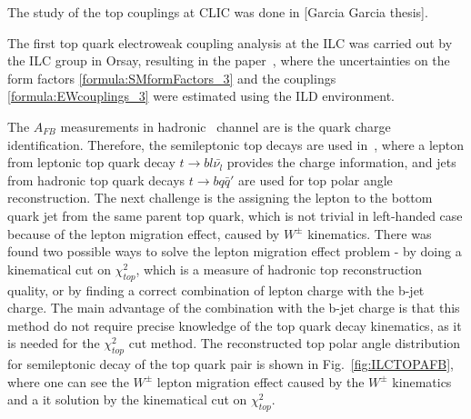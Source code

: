 The study of the top couplings at CLIC was done in [Garcia Garcia thesis]. 

The first top quark electroweak coupling analysis at the ILC was carried out by the ILC group in Orsay, resulting in the paper~\cite{bib:ILCTOP}, where the uncertainties on the form factors \ref{formula:SMformFactors_3} and the couplings \ref{formula:EWcouplings_3} were estimated using the ILD environment.


The $A_{FB}$ measurements in hadronic \ttbar\ channel are  is the quark charge identification. Therefore, the semileptonic top decays are used in~\cite{bib:ILCTOP}, where  a lepton from leptonic top quark decay $t\to b l \bar{\nu_l}$ provides the charge information, and jets from hadronic top quark decays $t \to b q \bar{q}'$ are used for top polar angle reconstruction. 
The next challenge is the assigning the lepton to the bottom quark jet from the same parent top quark, which is not trivial in left-handed case because of the lepton migration effect, caused by $W^\pm$ kinematics. 
There was found two possible ways to solve the lepton migration effect problem - by doing a kinematical cut on $\chi^2_{top}$, which is a measure of hadronic top reconstruction quality, or by finding a correct combination of lepton charge with the b-jet charge. 
The main advantage of the combination with the b-jet charge is that this method do not require precise knowledge of the top quark decay kinematics, as it is needed for the $\chi^2_{top}$ cut method. The reconstructed top polar angle distribution for semileptonic decay of the top quark pair is shown in Fig.~\ref{fig:ILCTOPAFB}, where one can see the $W^\pm$ lepton migration effect caused by the $W^\pm$ kinematics and a it solution by the kinematical cut on $\chi^2_{top}$.


